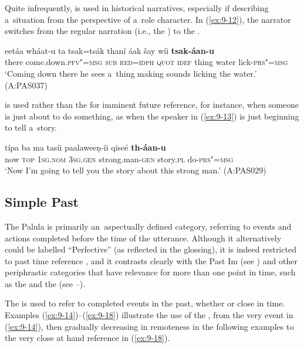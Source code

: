 Quite infrequently,  is used in historical narratives, especially if describing a~situation from the perspective of a~role character. In (\ref{ex:9-12}), the narrator switches from the regular narration  (i.e., the ) to the .

\begin{exe}
\ex
\label{ex:9-12}
\gll eetáa wháat-u ta tsak=tsák thaní áak šay wíi \textbf{tsak-áan-u}\\
there come.down.\textsc{pfv"=msg} \textsc{sub} \textsc{red}=\textsc{idph} \textsc{quot} \textsc{idef}  thing water lick-\textsc{prs"=msg}\\
\glt `Coming down there he sees a~thing making sounds licking the water.' (A:PAS037)
\end{exe}

 is used rather than the  for imminent future reference, for instance, when someone is just about to do something, as when the speaker in (\ref{ex:9-13}) is just beginning to tell a~story.

\begin{exe}
\ex
\label{ex:9-13}
\gll típa ba ma tasíi paalaweeṇ-íi qiseé \textbf{th-áan-u} \\
now \textsc{top} 1\textsc{sg.nom} 3\textsc{sg.gen} strong.man-\textsc{gen} story.\textsc{pl} do-\textsc{prs"=msg} \\
\glt `Now I'm going to tell you the story about this strong man.' (A:PAS029)
\end{exe}

\subsection{Simple Past}
\label{subsec:9-1-4}


The Palula  is primarily an~aspectually defined category, referring to events and actions completed before the time of the utterance. Although it alternatively could be labelled ``Perfective'' (as reflected in the glossing), it is indeed restricted to past time reference \citep[79]{dahl1985}, and it contrasts clearly with the Past Im (see ) and other periphrastic categories that have relevance for more than one point in time, such as the  and the  (see --).



The  is used to refer to completed events in the past, whether  or close in time. Examples (\ref{ex:9-14})--(\ref{ex:9-18}) illustrate the use of the , from the very  event in (\ref{ex:9-14}), then gradually decreasing in remoteness in the following examples to the very close at hand reference in (\ref{ex:9-18}).

